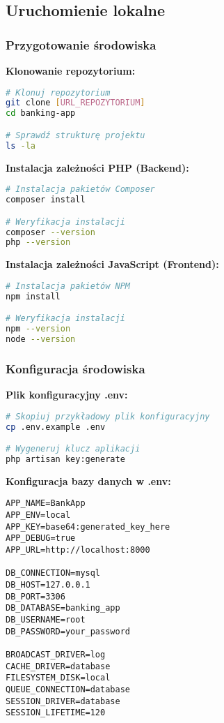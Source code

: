 \documentclass[12pt,a4paper]{article}
\begin{document}
    \subsection{Uruchomienie lokalne}

    \subsubsection{Przygotowanie środowiska}

    \textbf{Klonowanie repozytorium:}
    \begin{lstlisting}[language=bash, caption=Klonowanie projektu]
# Klonuj repozytorium
git clone [URL_REPOZYTORIUM]
cd banking-app

# Sprawdź strukturę projektu
ls -la
    \end{lstlisting}

    \textbf{Instalacja zależności PHP (Backend):}
    \begin{lstlisting}[language=bash, caption=Instalacja zależności PHP]
# Instalacja pakietów Composer
composer install

# Weryfikacja instalacji
composer --version
php --version
    \end{lstlisting}

    \textbf{Instalacja zależności JavaScript (Frontend):}
    \begin{lstlisting}[language=bash, caption=Instalacja zależności JavaScript]
# Instalacja pakietów NPM
npm install

# Weryfikacja instalacji
npm --version
node --version
    \end{lstlisting}

    \subsubsection{Konfiguracja środowiska}

    \textbf{Plik konfiguracyjny .env:}
    \begin{lstlisting}[language=bash, caption=Przygotowanie pliku .env]
# Skopiuj przykładowy plik konfiguracyjny
cp .env.example .env

# Wygeneruj klucz aplikacji
php artisan key:generate
    \end{lstlisting}

    \textbf{Konfiguracja bazy danych w .env:}
    \begin{lstlisting}[caption=Przykładowa konfiguracja bazy danych]
APP_NAME=BankApp
APP_ENV=local
APP_KEY=base64:generated_key_here
APP_DEBUG=true
APP_URL=http://localhost:8000

DB_CONNECTION=mysql
DB_HOST=127.0.0.1
DB_PORT=3306
DB_DATABASE=banking_app
DB_USERNAME=root
DB_PASSWORD=your_password

BROADCAST_DRIVER=log
CACHE_DRIVER=database
FILESYSTEM_DISK=local
QUEUE_CONNECTION=database
SESSION_DRIVER=database
SESSION_LIFETIME=120
    \end{lstlisting}
\end{document}
